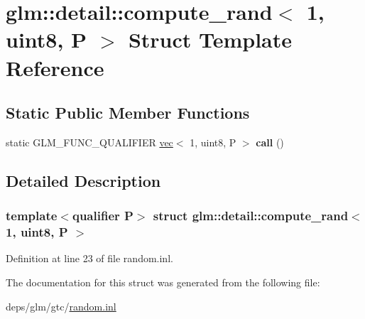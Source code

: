 \hypertarget{structglm_1_1detail_1_1compute__rand_3_011_00_01uint8_00_01P_01_4}{}\section{glm\+:\+:detail\+:\+:compute\+\_\+rand$<$ 1, uint8, P $>$ Struct Template Reference}
\label{structglm_1_1detail_1_1compute__rand_3_011_00_01uint8_00_01P_01_4}
\subsection*{Static Public Member Functions}
\begin{DoxyCompactItemize}
\item 
\mbox{\label{structglm_1_1detail_1_1compute__rand_3_011_00_01uint8_00_01P_01_4_a9391c8df40318095dabaf29789a665aa}} 
static G\+L\+M\+\_\+\+F\+U\+N\+C\+\_\+\+Q\+U\+A\+L\+I\+F\+I\+ER \hyperlink{structglm_1_1vec}{vec}$<$ 1, uint8, P $>$ {\bfseries call} ()
\end{DoxyCompactItemize}


\subsection{Detailed Description}
\subsubsection*{template$<$qualifier P$>$\newline
struct glm\+::detail\+::compute\+\_\+rand$<$ 1, uint8, P $>$}



Definition at line 23 of file random.\+inl.



The documentation for this struct was generated from the following file\+:\begin{DoxyCompactItemize}
\item 
deps/glm/gtc/\hyperlink{random_8inl}{random.\+inl}\end{DoxyCompactItemize}
